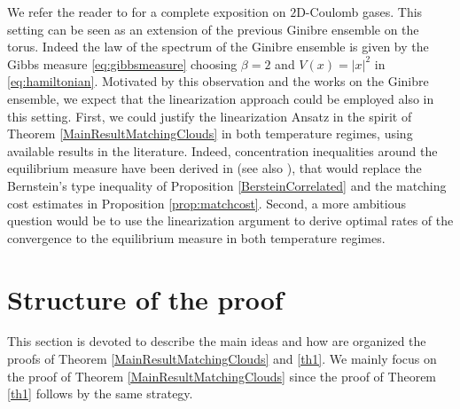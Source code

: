\documentclass[11pt,a4paper,oneside]{amsart}
\numberwithin{equation}{section}
\begin{document}
\begin{enumerate}
\begin{equation*}
%
\end{equation*}
%
We refer the reader to \cite{serfaty} for a complete exposition on $2$D-Coulomb gases. This setting can be seen as an extension of the previous Ginibre ensemble on the torus. Indeed the law of the spectrum of the Ginibre ensemble is given by the Gibbs measure \eqref{eq:gibbsmeasure} choosing $\beta=2$ and $V(x)=|x|^2$ in \eqref{eq:hamiltonian}. Motivated by this observation and the works \cite{maxime, Jonas} on the Ginibre ensemble, we expect that the linearization approach could be employed also in this setting. First, we could justify the linearization Ansatz in the spirit of Theorem \ref{MainResultMatchingClouds} in both temperature regimes, using available results in the literature. Indeed, concentration inequalities around the equilibrium measure have been derived in \cite{Zelada} (see also \cite{Chafai}), that would replace the Bernstein's type inequality of Proposition \ref{BersteinCorrelated} and the matching cost estimates in Proposition \ref{prop:matchcost}. Second, a more ambitious question would be to use the linearization argument to derive optimal rates of the convergence to the equilibrium measure in both temperature regimes.

\end{enumerate}





\section{Structure of the proof}\label{StrategyOfProofSection}
%
This section is devoted to describe the main ideas and how are organized the proofs of Theorem \ref{MainResultMatchingClouds} and \ref{th1}. We mainly focus on the proof of Theorem \ref{MainResultMatchingClouds} since the proof of Theorem \ref{th1} follows by the same strategy.

%
\medskip
%
\end{document}
